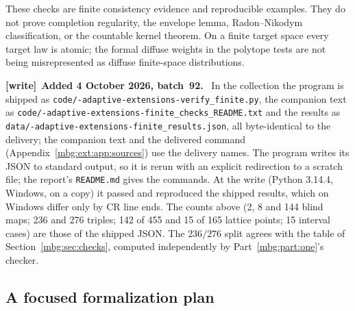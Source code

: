 \documentclass[11pt,letterpaper]{article}
\theoremstyle{definition}
\newenvironment{writenote}[1][]{\par\smallskip\begingroup\small
 \noindent\textbf{[write]}\if\relax\detokenize{#1}\relax\else~\textbf{#1.}\fi\ }%
 {\par\endgroup\smallskip}
\begin{document}
These checks are finite consistency evidence and reproducible examples. They do not prove completion regularity, the envelope lemma, Radon--Nikodym classification, or the countable kernel theorem. On a finite target space every target law is atomic; the formal diffuse weights in the polytope tests are not being misrepresented as diffuse finite-space distributions.

\begin{writenote}[Added 4 October 2026, batch~92]
In the collection the program is shipped as \texttt{code/-\allowbreak adaptive-\allowbreak extensions-\allowbreak verify\_\allowbreak finite.py}, the companion text as \texttt{code/-\allowbreak adaptive-\allowbreak extensions-\allowbreak finite\_\allowbreak checks\_\allowbreak README.txt} and the results as \texttt{data/-\allowbreak adaptive-\allowbreak extensions-\allowbreak finite\_\allowbreak results.json}, all byte-identical to the delivery; the companion text and the delivered command (Appendix~\ref{mbg:ext:app:sources}) use the delivery names. The program writes its JSON to standard output, so it is rerun with an explicit redirection to a scratch file; the report's \texttt{README.md} gives the commands. At the write (Python 3.14.4, Windows, on a copy) it passed and reproduced the shipped results, which on Windows differ only by CR line ends. The counts above (2, 8 and 144 blind maps; 236 and 276 triples; 142 of 455 and 15 of 165 lattice points; 15 interval cases) are those of the shipped JSON. The $236/276$ split agrees with the table of Section~\ref{mbg:sec:checks}, computed independently by Part~\ref{mbg:part:one}'s checker.
\end{writenote}

\subsection{A focused formalization plan}
\end{document}
